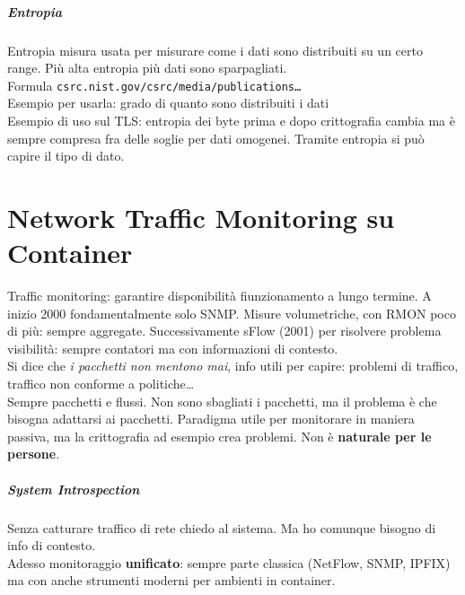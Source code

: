 \documentclass[10pt]{book}
\begin{document}
\paragraph{Entropia} Entropia misura usata per misurare come i dati sono distribuiti su un certo range. Più alta entropia più dati sono sparpagliati.\\
Formula \texttt{csrc.nist.gov/csrc/media/publications\ldots}\\
Esempio per usarla: grado di quanto sono distribuiti i dati\\
Esempio di uso sul TLS: entropia dei byte prima e dopo crittografia cambia ma è sempre compresa fra delle soglie per dati omogenei. Tramite entropia si può capire il tipo di dato.
\chapter{Network Traffic Monitoring su Container}
Traffic monitoring: garantire disponibilità fiunzionamento a lungo termine. A inizio 2000 fondamentalmente solo SNMP. Misure volumetriche, con RMON poco di più: sempre aggregate. Successivamente sFlow (2001) per risolvere problema visibilità: sempre contatori ma con informazioni di contesto.\\
Si dice che \textit{i pacchetti non mentono mai}, info utili per capire: problemi di traffico, traffico non conforme a politiche\ldots\\
Sempre pacchetti e flussi. Non sono sbagliati i pacchetti, ma il problema è che bisogna adattarsi ai pacchetti. Paradigma utile per monitorare in maniera passiva, ma la crittografia ad esempio crea problemi. Non è \textbf{naturale per le persone}.
\paragraph{System Introspection} Senza catturare traffico di rete chiedo al sistema. Ma ho comunque bisogno di info di contesto.\\
Adesso monitoraggio \textbf{unificato}: sempre parte classica (NetFlow, SNMP, IPFIX) ma con anche strumenti moderni per ambienti in container.
\end{document}
